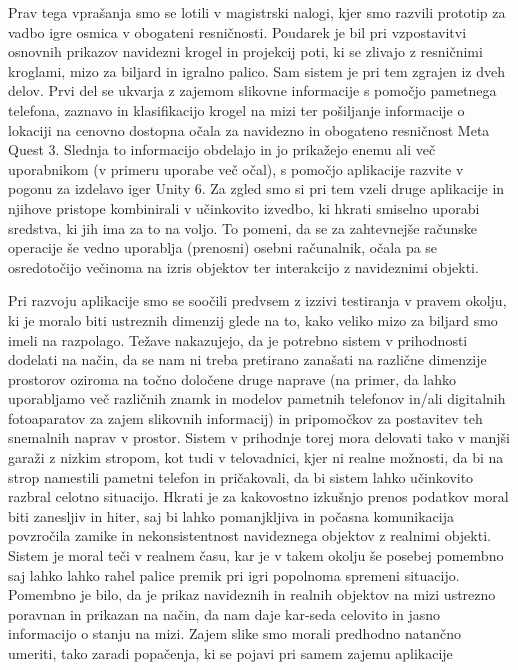 \documentclass[a4paper, 12pt]{book}
\begin{document}
Prav tega vprašanja smo se lotili v magistrski nalogi, kjer smo razvili prototip za vadbo igre osmica v obogateni resničnosti. Poudarek je bil pri vzpostavitvi osnovnih prikazov navidezni krogel in projekcij poti, ki se zlivajo z resničnimi kroglami, mizo za biljard in igralno palico. Sam sistem je pri tem zgrajen iz dveh delov. Prvi del se ukvarja z zajemom slikovne informacije s pomočjo pametnega telefona, zaznavo in klasifikacijo krogel na mizi ter pošiljanje informacije o lokaciji na cenovno dostopna očala za navidezno in obogateno resničnost Meta Quest 3. Slednja to informacijo obdelajo in jo prikažejo enemu ali več uporabnikom (v primeru uporabe več očal), s pomočjo aplikacije razvite v pogonu za izdelavo iger Unity 6. Za zgled smo si pri tem vzeli druge aplikacije \cite{Sousa2016, Yan2024Enhancing} in njihove pristope kombinirali v učinkovito izvedbo, ki hkrati smiselno uporabi sredstva, ki jih ima za to na voljo. To pomeni, da se za zahtevnejše računske operacije še vedno uporablja (prenosni) osebni računalnik, očala pa se osredotočijo večinoma na izris objektov ter interakcijo z navideznimi objekti.

Pri razvoju aplikacije smo se soočili predvsem z izzivi testiranja v pravem okolju, ki je moralo biti ustreznih dimenzij glede na to, kako veliko mizo za biljard smo imeli na razpolago. Težave nakazujejo, da je potrebno sistem v prihodnosti dodelati na način, da se nam ni treba pretirano zanašati na različne dimenzije prostorov oziroma na točno določene druge naprave (na primer, da lahko uporabljamo več različnih znamk in modelov pametnih telefonov in/ali digitalnih fotoaparatov za zajem slikovnih informacij) in pripomočkov za postavitev teh snemalnih naprav v prostor. Sistem v prihodnje torej mora delovati tako v manjši garaži z nizkim stropom, kot tudi v telovadnici, kjer ni realne možnosti, da bi na strop namestili pametni telefon in pričakovali, da bi sistem lahko učinkovito razbral celotno situacijo. Hkrati je za kakovostno izkušnjo prenos podatkov moral biti zanesljiv in hiter, saj bi lahko pomanjkljiva in počasna komunikacija povzročila zamike in nekonsistentnost navideznega objektov z realnimi objekti. Sistem je moral teči v realnem času, kar je v takem okolju še posebej pomembno saj lahko lahko rahel palice premik pri igri popolnoma spremeni situacijo. 
Pomembno je bilo, da je prikaz navideznih in realnih objektov na mizi ustrezno poravnan in prikazan na način, da nam daje kar-seda celovito in jasno informacijo o stanju na mizi. Zajem slike smo morali predhodno natančno umeriti, tako zaradi popačenja, ki se pojavi pri samem zajemu aplikacije
\end{document}
